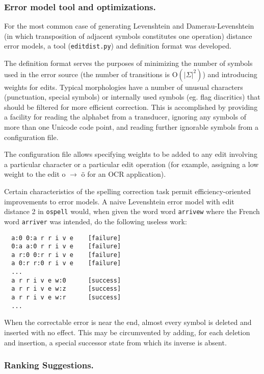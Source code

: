 \documentclass{llncs}
\begin{document}
\subsubsection{Error model tool and optimizations.}
For the most common case of generating Levenshtein and
Damerau-Levenshtein (in which transposition of adjacent symbols constitutes
one operation) distance error models, a tool (\verb!editdist.py!) and
definition format was developed.

The definition format serves the purposes of minimizing the number of symbols
used in the error source (the number of transitions is $\mathrm{O}(|\Sigma|^2)$)
and introducing weights for edits. Typical
morphologies have a number of unusual characters (punctuation, special symbols)
or internally used symbols (eg. flag diacritics) that should be filtered for
more efficient correction. This is accomplished by providing a facility for
reading the alphabet from a transducer, ignoring any symbols of more than
one Unicode code point, and reading further ignorable symbols from a
configuration file.

The configuration file allows specifying weights to be added to any edit
involving a particular character or a particular edit operation (for example,
assigning a low weight to the edit o $\rightarrow$ ö for an OCR application).

Certain characteristics of the spelling correction task permit
efficiency-oriented improvements to error models. A naive Levenshtein error
model with edit distance 2 in \verb!ospell! would, when given the word
word \verb!arrivew! where the French word \verb!arriver! was intended,
do the following useless work:

{\footnotesize
\begin{verbatim}
  a:0 0:a r r i v e    [failure]
  0:a a:0 r r i v e    [failure]
  a r:0 0:r r i v e    [failure]
  a 0:r r:0 r i v e    [failure]
  ...
  a r r i v e w:0      [success]
  a r r i v e w:z      [success]
  a r r i v e w:r      [success]
  ...
\end{verbatim}
}

When the correctable error is near the end, almost every symbol is deleted and
inserted with no effect. This may be circumvented by adding, for each deletion
and insertion, a special successor state from which its inverse is absent.

\subsubsection{Ranking Suggestions.}
\end{document}
